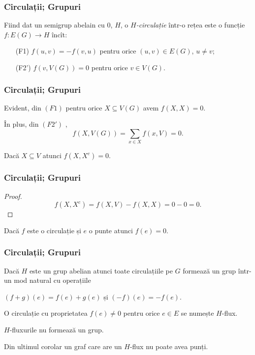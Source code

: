 \begin{frame}
  \frametitle{Circulații; Grupuri}

Fiind dat un semigrup abelain cu 0, $H$, o \emph{$H$-circulație} într-o rețea este o funcție $f:E(G)\to H$ încît:
\begin{itemize}
  \item[(F1)] $f(u,v)=-f(v,u)$ pentru orice $(u,v)\in E(G)$, $u\neq v$;
  \item[(F2')] $f(v,V(G))=0$ pentru orice $v\in V(G)$.
\end{itemize}

 
\end{frame}

\begin{frame}
  \frametitle{Circulații; Grupuri}

Evident, din $(F1)$ pentru orice $X\subseteq V(G)$ avem $f(X,X)=0$.

În plus, din $(F2')$ , 
\[
  f(X,V(G))=\sum_{x\in X}f(x,V)=0.
\]

\begin{theorem}
Dacă $X\subseteq V$ atunci $f(X,X^c)=0$.
\end{theorem}

\end{frame}


\begin{frame}
  \frametitle{Circulații; Grupuri}

\begin{proof}
\[
  f(X,X^c)=f(X,V)-f(X,X)=0-0=0.
\]

\end{proof}

\begin{corollary}
Dacă $f$ este o circulație și $e$ o punte atunci $f(e)=0$. 
\end{corollary}


\end{frame}

\begin{frame}
  \frametitle{Circulații; Grupuri}

Dacă $H$ este un grup abelian atunci toate circulațiile pe $G$ formează un grup într-un mod natural cu operațiile

$(f+g)(e)=f(e)+g(e)$ și $(-f)(e)=-f(e)$.

O circulație cu proprietatea $f(e)\neq 0$ pentru orice $e\in E$ se numește $H$-flux.

$H$-fluxurile nu formează un grup. 

Din ultimul corolar un graf care are un $H$-flux nu poate avea punți.

\end{frame}

